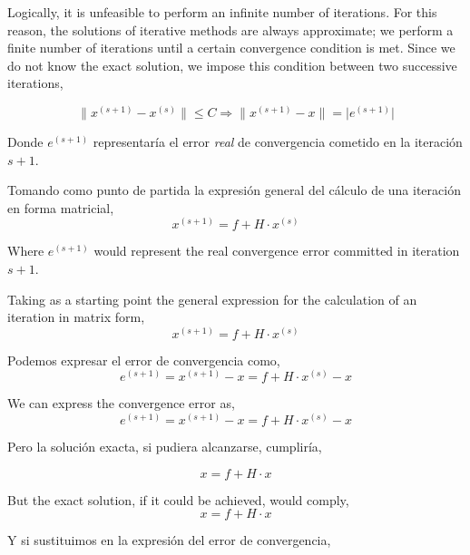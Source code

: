 \begin{paracol}{2}
\switchcolumn
Logically, it is unfeasible to perform an infinite number of iterations. For this reason, the solutions of iterative methods are always approximate; we perform a finite number of iterations until a certain convergence condition is met. Since we do not know the exact solution, we impose this condition between two successive iterations,

\begin{equation*}
 \lVert x^{(s+1)}-x^{(s)}\rVert \leq C \Rightarrow  \lVert x^{(s+1)}-x\rVert = \lvert e^{(s+1)} \rvert
\end{equation*}

\switchcolumn
Donde $e^{(s+1)}$ representaría el error \emph{real} de convergencia cometido en la iteración $s+1$.

Tomando como punto de partida la expresión general del cálculo de una iteración en forma matricial,
\begin{equation*}
x^{(s+1)}=f+H\cdot x^{(s)}
\end{equation*}

\switchcolumn
Where $e^{(s+1)}$ would represent the real convergence error committed in iteration $s+1$.

Taking as a starting point the general expression for the calculation of an iteration in matrix form,
\begin{equation*}
x^{(s+1)}=f+H\cdot x^{(s)}
\end{equation*}

\switchcolumn
Podemos expresar el error de convergencia como,
\begin{equation*}
e^{(s+1)}=x^{(s+1)}-x=f+H\cdot x^{(s)}-x
\end{equation*}

\switchcolumn
We can express the convergence error as,
\begin{equation*}
e^{(s+1)}=x^{(s+1)}-x=f+H\cdot x^{(s)}-x
\end{equation*}

\switchcolumn
Pero la solución exacta, si pudiera alcanzarse, cumpliría,

\begin{equation*}
x=f+H\cdot x
\end{equation*}

\switchcolumn

But the exact solution, if it could be achieved, would comply,
\begin{equation*}
x=f+H\cdot x
\end{equation*}

\switchcolumn
Y si sustituimos en la expresión del error de convergencia,


\end{paracol}
